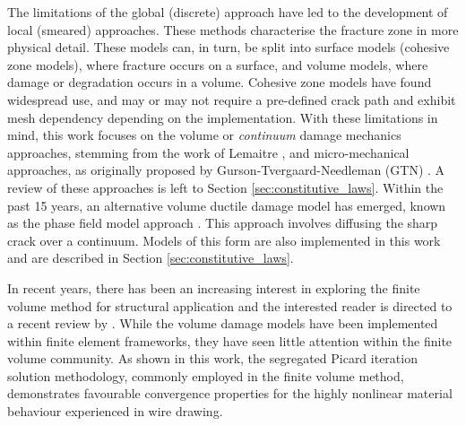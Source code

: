 \documentclass[sn-mathphys,Numbered]{sn-jnl}%
\begin{document}
The limitations of the global (discrete) approach have led to the development of local (smeared) approaches.
These methods characterise the fracture zone in more physical detail.
These models can, in turn, be split into surface models (cohesive zone models), where fracture occurs on a surface, and volume models, where damage or degradation occurs in a volume.
Cohesive zone models have found widespread use, and may or may not require a pre-defined crack path and exhibit mesh dependency depending on the implementation.
With these limitations in mind, this work focuses on the volume or \emph{continuum} damage mechanics approaches, stemming from the work of Lemaitre \cite{lemaitre_continuous_1985, lemaitre_engineering_2005}, and micro-mechanical approaches, as originally proposed by Gurson-Tvergaard-Needleman (GTN) \cite{gurson_continuum_1977, tvergaard_analysis_1984}.
A review of these approaches is left to Section \ref{sec:constitutive_laws}.
Within the past 15 years, an alternative volume ductile damage model has emerged, known as the phase field model approach \cite{ambati_phase-field_2015, borden_phase-field_2016, miehe_phase_2016, dittmann_variational_2018, samaniego_phase-field_2021}. This approach involves diffusing the sharp crack over a continuum.
Models of this form are also implemented in this work and are described in Section \ref{sec:constitutive_laws}.


In recent years, there has been an increasing interest in exploring the finite volume method for structural application and the interested reader is directed to a recent review by \citet{cardiff_thirty_2021}.
While the volume damage models have been implemented within finite element frameworks, they have seen little attention within the finite volume community.
As shown in this work, the segregated Picard iteration solution methodology, commonly employed in the finite volume method, demonstrates favourable convergence properties for the highly nonlinear material behaviour experienced in wire drawing.
\end{document}
